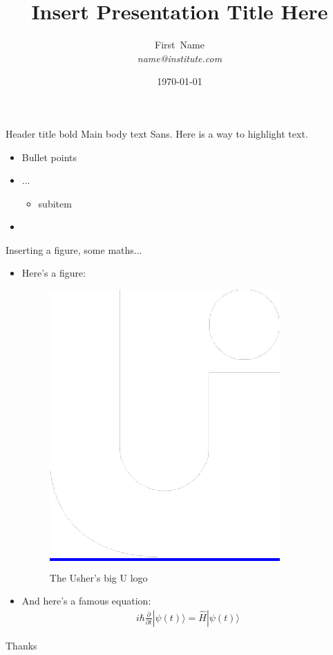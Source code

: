 \documentclass{beamer}
\title[Insert Title (short version of title)]{Insert Presentation Title Here}
\author[Short~Name]{%
	{\rm First~Name}\\
	{\it name@institute.com}
}
\institute[Short~Institution]{First Institution}
\date{\today}
\begin{document}
\begin{frame}
  \titlepage
\end{frame}

\begin{frame}[t]{Header title bold}
  Main body text Sans. Here is a way to \alert{highlight text}.
  \label{sec:Test1}
  \begin{itemize}
  \item Bullet points
  \item ...
    \begin{itemize}
    \item subitem
    \end{itemize}
  \item \lipsum[2]
  \end{itemize}
\end{frame}



\begin{frame}{Inserting a figure, some maths...}
  \begin{itemize}
  \item   Here's a figure:
    \begin{figure}[h]
      \centering
      \colorbox{blue}{\includegraphics[width=.13\linewidth]{./assets/img/logo}}
      \caption{The Usher's big U logo}
      \label{fig:big-u}
    \end{figure}
  \item 
    And here's a famous equation:
  \begin{eqnarray}
    \label{eq:schroedinger}
    i\hbar {\frac {\partial }{\partial t}}|\psi (t)\rangle ={\hat {H}}|\psi (t)\rangle
  \end{eqnarray}
  \end{itemize}
\end{frame}

\begin{frame}
	\begin{center}
		{\fontsize{50}{60}\selectfont Thanks}
	\end{center}
\end{frame}
\end{document}
